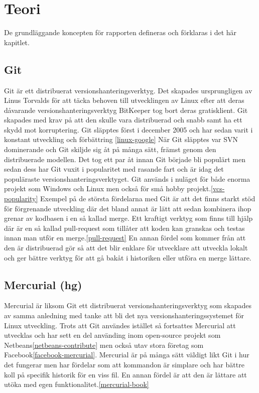 \section{Teori}
\label{sec:bjorn-theory}
De grundläggande koncepten för rapporten defineras och förklaras i det här kapitlet.

\subsection{Git}
Git är ett distribuerat versionshanteringsverktyg. Det skapades ursprungligen av Linus Torvalds för att täcka behoven till utvecklingen av Linux efter att deras dåvarande versionshanteringsverktyg BitKeeper tog bort deras gratisklient. Git skapades med krav på att den skulle vara distribuerad och snabb samt ha ett skydd mot korruptering. Git släpptes först i december 2005 och har sedan varit i konstant utveckling och förbättring \ref{linux-google} När Git släpptes var SVN dominerande och Git skiljde sig åt på många sätt, främst genom den distribuerade modellen. Det tog ett par åt innan Git började bli populärt men sedan dess har Git vuxit i popularitet med rasande fart och är idag det populäraste versionshanteringsverktyget. Git används i nuläget för både enorma projekt som Windows och Linux men också för små hobby projekt.\ref{vcs-popularity}
Exempel på de största fördelarna med Git är att det finns starkt stöd för förgrenande utveckling där det bland annat är lätt att sedan kombinera ihop grenar av kodbasen i en så kallad merge. Ett kraftigt verktyg som finns till hjälp där är en så kallad pull-request som tillåter att koden kan granskas och testas innan man utför en merge.\ref{pull-request} En annan fördel som kommer från att den är distribuerad gör så att det blir enklare för utvecklare att utveckla lokalt och ger bättre verktyg för att gå bakåt i historiken eller utföra en merge lättare.

\subsection{Mercurial (hg)}
Mercurial är liksom Git ett distribuerat versionshanteringsverktyg som skapades av samma anledning med tanke att bli det nya versionshanteringssystemet för Linux utveckling. Trots att Git användes istället så fortsattes Mercurial att utvecklas och har sett en del använding inom open-source projekt som Netbeans\ref{netbeans-contribute} men också utav stora företag som Facebook\ref{facebook-mercurial}.
Mercurial är på många sätt väldigt likt Git i hur det fungerar men har fördelar som att kommandon är simplare och har bättre koll på specifik historik för en viss fil. En annan fördel är att den är lättare att utöka med egen funktionalitet.\ref{mercurial-book}

